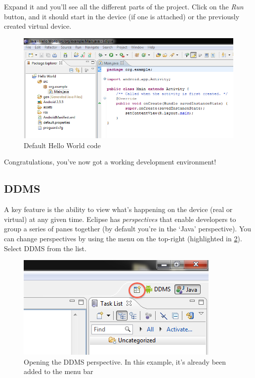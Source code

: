 Expand it and you'll see all the different parts of the project. Click on the \textit{Run} button, and it should start in the device (if one is attached) or the previously created virtual device.

\begin{figure}[!ht]
  \includegraphics[width=\textwidth]{./images/hello_world_code.png}%
  \caption{Default Hello World code}
  \label{fig:hello_world_code}
\end{figure}

Congratulations, you've now got a working development environment!

\subsection{DDMS}

A key feature is the ability to view what's happening on the device (real or virtual) at any given time. Eclipse has \emph{perspectives} that enable developers to group a series of panes together (by default you're in the `Java' perspective). You can change perspectives by using the menu on the top-right (highlighted in \ref{fig:perspectives}). Select DDMS from the list. 

\begin{figure}[!ht]
  \includegraphics[width=\textwidth]{./images/open_perspective.png}%
  \caption{Opening the DDMS perspective. In this example, it's already been added to the menu bar}
  \label{fig:perspectives}
\end{figure}

